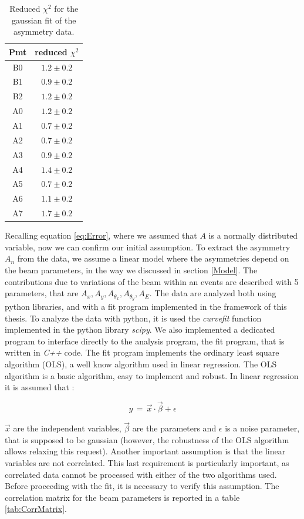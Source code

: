 \begin{table}[!h]
\centering
\begin{tabular}{c|c}
\hline 
Pmt & reduced $\chi^{2}$ \\ 
\hline
B0 & $1.2 \pm 0.2$ \\ 
B1 & $0.9 \pm 0.2$ \\ 
B2 & $1.2 \pm 0.2$ \\
A0 & $1.2 \pm 0.2$ \\ 
A1 & $0.7 \pm 0.2$ \\ 
A2 & $0.7 \pm 0.2$ \\ 
A3 & $0.9 \pm 0.2$ \\ 
A4 & $1.4 \pm 0.2$ \\ 
A5 & $0.7 \pm 0.2$ \\ 
A6 & $1.1 \pm 0.2$ \\ 
A7 & $1.7 \pm 0.2$ \\ 
\hline 
\end{tabular}
\caption{Reduced $\chi^{2}$ for the gaussian fit of the asymmetry data.} 
\label{tab:Chisq}
\end{table}

Recalling equation \ref{eq:Error}, where we assumed that $A$ is a normally distributed variable, now we can confirm our initial assumption. To extract the asymmetry $A_{n}$ from the data, we assume a linear model where the asymmetries depend on the beam parameters, in the way we discussed in section \ref{Model}. The contributions due to variations of the beam within an events are described with 5 parameters, that are  $A_{x},A_{y},A_{\theta_{x}},A_{\theta_{y}},A_{E}$.
The data are analyzed both using python libraries, and with a fit program implemented in the framework of this thesis. To analyze the data with python, it is used the \textit{curvefit} function implemented in the python library \textit{scipy}. We also implemented a dedicated program to interface directly to the analysis program, the fit program, that is written in \textit{C++} code. The fit program implements the ordinary least square algorithm (OLS), a well know algorithm used in linear regression. The OLS algorithm is a basic algorithm, easy to implement and robust. In linear regression it is assumed that :

\begin{equation}
 y \, = \, \vec{x} \cdot \vec{\beta} + \epsilon
\end{equation}

$\vec{x}$ are the independent variables, $\vec{\beta}$ are the parameters and $\epsilon$ is a noise parameter, that is supposed to be gaussian (however, the robustness of the OLS algorithm allows relaxing this request). Another important assumption is that the linear variables are not correlated. 
This last requirement is particularly important, as correlated data cannot be processed with either of the two algorithms used. Before proceeding with the fit, it is necessary to verify this assumption. The correlation matrix for the beam parameters is reported in a table \ref{tab:CorrMatrix}.

